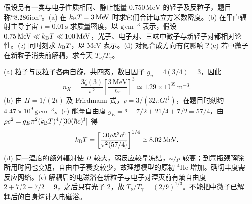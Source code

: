 \begin{exercise}
假设另有一类与电子性质相同、静止能量 $0.750\,\mathrm{MeV}$ 的轻子及反粒子，题目称“8.286ion”。(a) 在 $k_{\mathrm B} T=3\,\mathrm{MeV}$ 时求它们合计每立方米数密度。(b) 在平直辐射主导宇宙 $t=0.01\,\mathrm s$ 求质量密度，以 $\mathrm{g\,cm^{-3}}$ 表示，假设 $0.75\,\mathrm{MeV}\ll k_{\mathrm B} T\ll100\,\mathrm{MeV}$，光子、电子对、三味中微子与新轻子对都相对论性。(c) 同时刻求 $k_{\mathrm B} T$，以 MeV 表示。(d) 对氦合成方向有何影响？(e) 若中微子在新粒子消失前解耦，求今天 $T_\nu/T_\gamma$。
\end{exercise}
\begin{solution}
(a) 粒子与反粒子各两自旋，共四态，数目因子 $g_{n}=4(3/4)=3$，因此
\[
n_X=\frac{3\zeta(3)}{\pi^2}
\left[\frac{3\,\mathrm{MeV}}{\hbar c}\right]^3
\simeq1.29\times10^{39}\,\mathrm{m^{-3}}.
\]
(b) 由 $H=1/(2t)$ 及 Friedmann 式，$\rho=3/(32\pi Gt^2)$，在题目时刻约 $4.47\times10^9\,\mathrm{g\,cm^{-3}}$。(c) 能量自由度 $g_E=2+7/2+21/4+7/2=57/4$，由 $\rho c^2=g_E\pi^2(k_{\mathrm B} T)^4/[30(\hbar c)^3]$ 得
\[
k_{\mathrm B} T=\left[\frac{30\rho\hbar^3c^5}{\pi^2(57/4)}\right]^{1/4}
\simeq8.02\,\mathrm{MeV}.
\]
(d) 同一温度的额外辐射使 $H$ 较大，弱反应较早冻结，$n/p$ 较高；到氘瓶颈解除所用时间也变短，自由中子衰变较少，故理想模型的原初 $^4\mathrm{He}$ 增加。确切丰度需反应网络。(e) 解耦后的电磁浴在新粒子与电子对湮灭前有熵自由度 $2+7/2+7/2=9$，之后只有光子 $2$，故 $T_\nu/T_\gamma=(2/9)^{1/3}$。不能把中微子已解耦后的自身熵计入电磁浴。
\end{solution}

